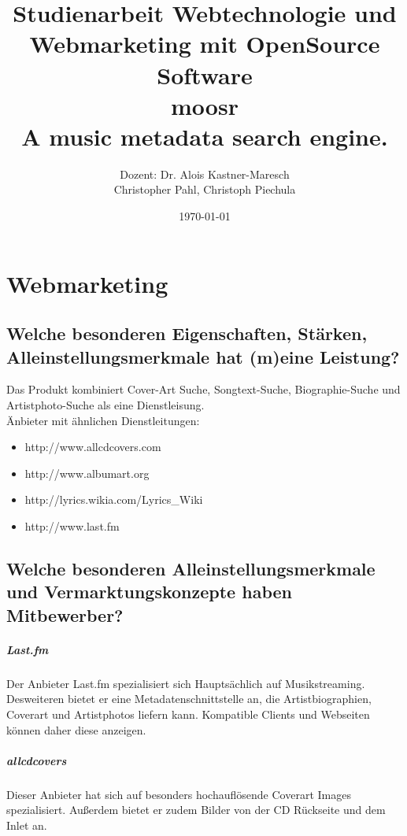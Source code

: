 \documentclass[11pt]{scrreprt}
\title{Studienarbeit Webtechnologie und Webmarketing mit OpenSource Software \\
    \textcolor{WildStrawberry}{\huge{moosr}} \\
    \normalsize{A music metadata search engine.}
}
\author{Dozent: Dr. Alois Kastner-Maresch\\
Christopher Pahl, Christoph Piechula}
\date{\today}
\begin{document}
\maketitle
\tableofcontents

\chapter{Webmarketing}

\section{Welche besonderen Eigenschaften, Stärken,
Alleinstellungsmerkmale hat (m)eine Leistung?}

Das Produkt kombiniert Cover-Art Suche, Songtext-Suche, Biographie-Suche und
Artistphoto-Suche als eine Dienstleisung.
\\
Änbieter mit ähnlichen Dienstleitungen: \\

\begin{itemize}
    \item http://www.allcdcovers.com
    \item http://www.albumart.org
    \item http://lyrics.wikia.com/Lyrics\_Wiki
    \item http://www.last.fm
\end{itemize}


\section{Welche besonderen Alleinstellungsmerkmale und
Vermarktungskonzepte haben Mitbewerber?}

\paragraph{Last.fm}
Der Anbieter Last.fm spezialisiert sich Hauptsächlich auf Musikstreaming.
Desweiteren bietet er eine Metadatenschnittstelle an, die Artistbiographien,
Coverart und Artistphotos liefern kann. Kompatible Clients und Webseiten können
daher diese anzeigen.


\paragraph{allcdcovers}
Dieser Anbieter hat sich auf besonders hochauflösende Coverart Images
spezialisiert. Außerdem bietet er zudem Bilder von der CD Rückseite und dem
Inlet an.
\end{document}
